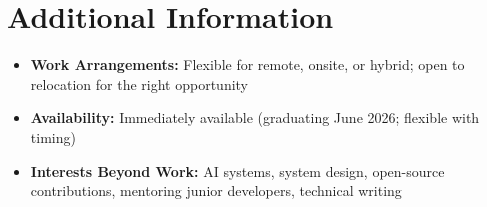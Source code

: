 \documentclass[11pt,a4paper]{article}
\begin{document}
\vspace{6pt}

\section{Additional Information}

\begin{itemize}
    \item \textbf{Work Arrangements:} Flexible for remote, onsite, or hybrid; open to relocation for the right opportunity
    \item \textbf{Availability:} Immediately available (graduating June 2026; flexible with timing)
    \item \textbf{Interests Beyond Work:} AI systems, system design, open-source contributions, mentoring junior developers, technical writing
\end{itemize}

\vspace{10pt}

\end{document}
